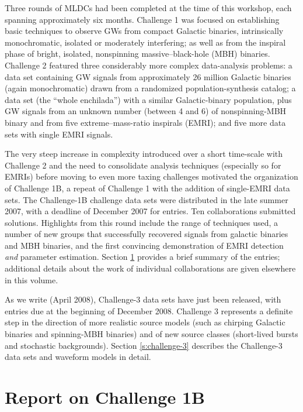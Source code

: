 \documentclass{iopart}
\begin{document}
Three rounds of MLDCs had been completed at the time of this workshop, each spanning approximately six months. Challenge 1 \cite{mldclisasymp,mldcgwdaw1} was focused on establishing basic techniques to observe GWs from compact Galactic binaries, intrinsically monochromatic, isolated or moderately interfering; as well as from the inspiral phase of bright, isolated, nonspinning massive--black-hole (MBH) binaries. Challenge 2 \cite{mldcgwdaw2,mldcamaldi2} featured three considerably more complex data-analysis problems: a data set containing GW signals from approximately 26 million Galactic binaries (again monochromatic) drawn from a randomized population-synthesis catalog; a data set (the ``whole enchilada'') with a similar Galactic-binary population, plus GW signals from an unknown number (between 4 and 6) of nonspinning-MBH binary and from five extreme--mass-ratio inspirals (EMRI); and five more data sets with single EMRI signals.

The very steep increase in complexity introduced over a short time-scale with Challenge 2 and the need to consolidate analysis techniques  (especially so for EMRIs) before moving to even more taxing challenges motivated the organization of Challenge 1B, a repeat of Challenge 1 with the addition of single-EMRI data sets. The Challenge-1B challenge data sets were distributed in the late summer 2007, with a deadline of December 2007 for entries. Ten collaborations submitted solutions. Highlights from this round include the range of techniques used, a number of new groups that successfully recovered signals from galactic binaries and MBH binaries, and the first convincing demonstration of EMRI detection \emph{and} parameter estimation. Section \ref{s:challenge-1b} provides a brief summary of the entries; additional details about the work of individual collaborations are given elsewhere in this volume.

As we write (April 2008), Challenge-3 data sets have just been released, with entries due at the beginning of December 2008. Challenge 3 represents a definite step in the direction of more realistic source models (such as chirping Galactic binaries and spinning-MBH binaries) and of new source classes (short-lived bursts and stochastic backgrounds). Section \ref{s:challenge-3} describes the Challenge-3 data sets and waveform models in detail.

\section{Report on Challenge 1B}
\label{s:challenge-1b}
\end{document}
